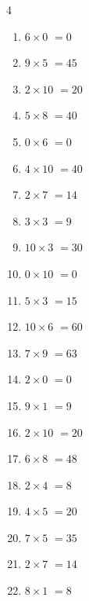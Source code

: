\begin{multicols}{4}
\begin{enumerate}
  \item $6\times 0$
        $=0$

  \item $9\times 5$
        $=45$

  \item $2\times 10$
        $=20$

  \item $5\times 8$
        $=40$

  \item $0\times 6$
        $=0$

  \item $4\times 10$
        $=40$

  \item $2\times 7$
        $=14$

  \item $3\times 3$
        $=9$

  \item $10\times 3$
        $=30$

  \item $0\times 10$
        $=0$

  \item $5\times 3$
        $=15$

  \item $10\times 6$
        $=60$

  \item $7\times 9$
        $=63$

  \item $2\times 0$
        $=0$

  \item $9\times 1$
        $=9$

  \item $2\times 10$
        $=20$

  \item $6\times 8$
        $=48$

  \item $2\times 4$
        $=8$

  \item $4\times 5$
        $=20$

  \item $7\times 5$
        $=35$

  \item $2\times 7$
        $=14$

  \item $8\times 1$
        $=8$

\columnbreak %

\resetques


\end{enumerate}
\end{multicols}
